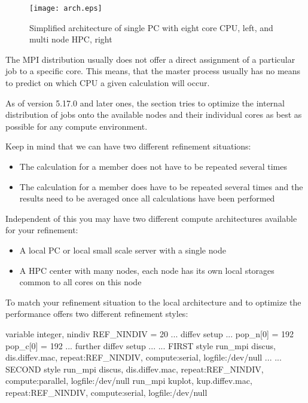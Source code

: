\begin{figure}
   \texttt{[image: arch.eps]}
   \caption{Simplified architecture of single PC with eight core CPU, left,
            and multi node HPC, right}
   \label{fevo-arch}
\end{figure}

The MPI distribution usually does not offer a direct assignment of a 
particular job to a specific core. This means, that the master process 
usually has no means to predict on which CPU a given calculation will occur. 

As of version 5.17.0 and later ones, the \Diffev section tries to optimize
the internal distribution of jobs onto the available nodes and their individual
cores as best as possible for any compute environment.

Keep in mind that we can have two different refinement situations:
\begin{itemize}
  \item The calculation for a member does not have to be repeated several 
        times
  \item The calculation for a member does have to be repeated several 
        times and the results need to be averaged once all calculations
        have been performed
\end{itemize}

Independent of this you may have two different compute architectures
available for your refinement:
\begin{itemize}
  \item A local PC or local small scale server with a single node
  \item A HPC center with many nodes, each node has its own local 
        storages common to all cores on this node
\end{itemize}

To match your refinement situation to the local architecture and to optimize
the performance \Diffev offers two different refinement styles:

\begin{MacVerbatim}
variable integer, nindiv
REF_NINDIV = 20
... diffev setup ...
pop_n[0] = 192
pop_c[0] = 192
... further diffev setup ...
... FIRST style
run_mpi discus, dis.diffev.mac, repeat:REF_NINDIV, compute:serial, logfile:/dev/null
...
... SECOND style
run_mpi discus, dis.diffev.mac, repeat:REF_NINDIV, compute:parallel, logfile:/dev/null
run_mpi kuplot, kup.diffev.mac, repeat:REF_NINDIV, compute:serial, logfile:/dev/null
\end{MacVerbatim}


